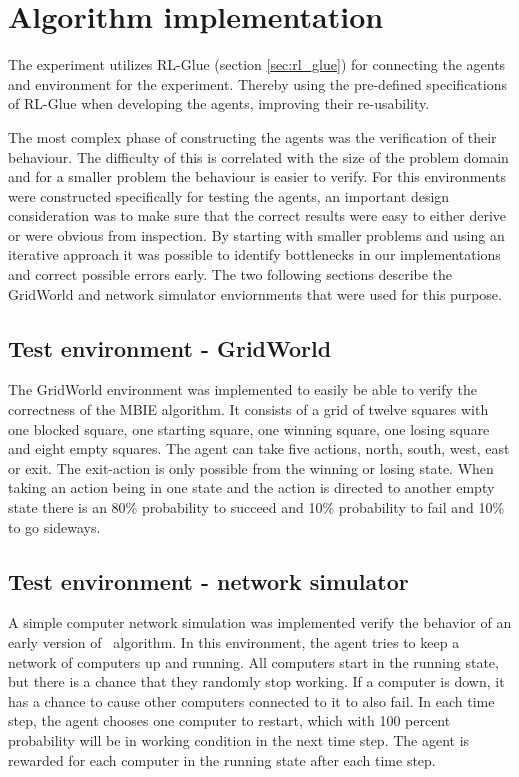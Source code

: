 \section{Algorithm implementation}
\label{sec:implementation}

The experiment utilizes RL-Glue (section \ref{sec:rl_glue}) for connecting the
agents and environment for the experiment. Thereby using the pre-defined
specifications of RL-Glue when developing the agents, improving their
re-usability. 

The most complex phase of constructing the agents was the verification of their
behaviour. The difficulty of this is correlated with the size of the problem
domain and for a smaller problem the behaviour is easier to verify. For this 
environments were constructed specifically for testing the agents, an
important design consideration was to make sure that the correct results were
easy to either derive or were obvious from inspection. By starting with smaller
problems and using an iterative approach it was possible to identify
bottlenecks in our implementations and correct possible errors early. The two
following sections describe the GridWorld and network simulator enviornments
that were used for this purpose. 

\subsection{Test environment - GridWorld}
\label{sec:intro_grid_world}

The GridWorld environment was implemented to easily be able to verify the
correctness of the MBIE algorithm. It consists of a grid of twelve squares with
one blocked square, one starting square, one winning square, one losing square and
eight empty squares. The agent can take five actions, north, south, west,
east or exit. The exit-action is only possible from the winning or losing
state. When taking an action being in one state and the action is directed to
another empty state there is an 80\% probability to succeed and 10\%
probability to fail and 10\% to go sideways.

\subsection{Test environment - network simulator}

A simple computer network simulation was implemented verify the behavior of an
early version of \etre\ algorithm. In this environment, the agent tries to keep
a network of computers up and running. All computers start in the running
state, but there is a chance that they randomly stop working. If a computer is
down, it has a chance to cause other computers connected to it to also fail. In
each time step, the agent chooses one computer to restart, which with 100
percent probability will be in working condition in the next time step. The
agent is rewarded for each computer in the running state after each time step. 




